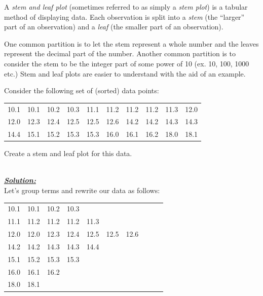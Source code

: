 A \textit{stem and leaf plot} (sometimes referred to as simply a \textit{stem plot}) is a tabular method of displaying data.
Each observation is split into a \textit{stem} (the ``larger'' part of an observation) and a \textit{leaf} (the smaller part of an observation).\\

\vspace*{-0.50em}

One common partition is to let the stem represent a whole number and the leaves represent the decimal part of the number.
Another common partition is to consider the stem to be the integer part of some power of 10 (ex. 10, 100, 1000 etc.) Stem and leaf plots are easier to understand with the aid of an example.

\begin{example}
Consider the following set of (sorted) data points:
\begin{center}
\begin{tabular}{c c c c c c c c c c}
10.1	&	10.1	&	10.2	&	10.3	&	11.1	&	11.2	&	11.2	&	11.2	&	11.3	&	12.0	\\ 
12.0	&	12.3	&	12.4	&	12.5	&	12.5	&	12.6	&	14.2	&	14.2	&	14.3	&	14.3	\\
14.4	&	15.1	&	15.2	&	15.3	&	15.3	&	16.0	&	16.1	&	16.2	&	 18.0	&	18.1
\end{tabular}
\end{center}

Create a stem and leaf plot for this data.

\vspace*{-0.50em}

\hfill\\
{\emph{\textbf{\underline{Solution:}}}}\\

\noindent
Let's group terms and rewrite our data as follows:
\begin{center}
\begin{tabular}{c c c c c c c c c c}
10.1	&	10.1	&	10.2	&	10.3	\\ 
11.1	&	11.2	&	11.2	&	11.2	&	11.3	\\
12.0	&	12.0	&	12.3	&	12.4	&	12.5	&	12.5	&	12.6	\\
14.2	&	14.2	&	14.3	&	14.3	&	14.4	\\	
15.1	&	15.2	&	15.3	&	15.3	\\
16.0	&	16.1	&	16.2	\\
18.0	&	18.1	\\
\end{tabular}
\end{center}


\end{example}
